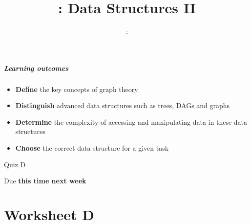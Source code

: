 \usepackage{../../beamerthemeFalmouthGamesAcademy}
\usepackage{multimedia}
\graphicspath{ {../../} }

\lstset{language=Python}

\usepackage[normalem]{ulem}
\usepackage{wasysym}

\usepackage{pdfpages}

\usetikzlibrary{arrows,automata,tikzmark,calc}

\usepackage{algpseudocode}
\usepackage{qtree}




\title{\sessionnumber: Data Structures II}
\subtitle{\modulecode: \moduletitle}

\frame{\titlepage} 

\begin{frame}
	\frametitle{Learning outcomes}
	\begin{itemize}
		\item \textbf{Define} the key concepts of graph theory
		\item \textbf{Distinguish} advanced data structures such as trees, DAGs and graphs
		\item \textbf{Determine} the complexity of accessing and manipulating data in these data structures
		\item \textbf{Choose} the correct data structure for a given task
	\end{itemize}
\end{frame}

\begin{frame}{Quiz D}
	\begin{center}
		Due \textbf{this time next week}
	\end{center}
\end{frame}





\part{Worksheet D}
\frame{\partpage}


